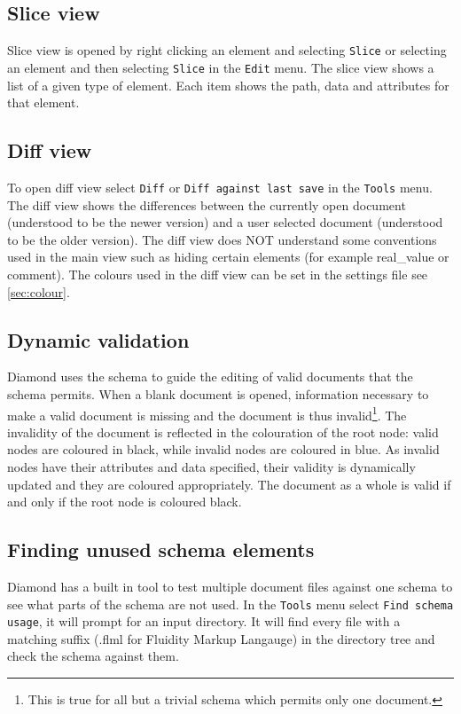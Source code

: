 \subsection{Slice view}
Slice view is opened by right clicking an element and selecting \verb+Slice+ or 
selecting an element and then selecting \verb+Slice+ in the \verb+Edit+ menu. 
The slice view shows a list of a given type of element. Each item shows the path, data and attributes for that element.

\subsection{Diff view}
To open diff view select \verb+Diff+ or \verb+Diff against last save+ in the \verb+Tools+ menu.
The diff view shows the differences between the currently open document (understood to be the newer version)
and a user selected document (understood to be the older version). The diff view does NOT understand some conventions
used in the main view such as hiding certain elements (for example real\_value or comment).
The colours used in the diff view can be set in the settings file see \ref{sec:colour}.

\subsection{Dynamic validation}
Diamond uses the schema to guide the editing of valid documents that the schema 
permits. When a blank document is opened, information necessary to make a valid
document is missing and the document is thus invalid\footnote{This is true for all
but a trivial schema which permits only one document.}. The invalidity of the document
is reflected in the colouration of the root node: valid nodes are coloured in black,
while invalid nodes are coloured in blue. As invalid nodes have their attributes
and data specified, their validity is dynamically updated and they are coloured appropriately.
The document as a whole is valid if and only if the root node is coloured black.

\subsection{Finding unused schema elements}
Diamond has a built in tool to test multiple document files against one schema to see what parts of the schema are not used.
In the \verb+Tools+ menu select \verb+Find schema usage+, it will prompt for an input directory. It will find every file with
a matching suffix (.flml for Fluidity Markup Langauge) in the directory tree and check the schema against them.
